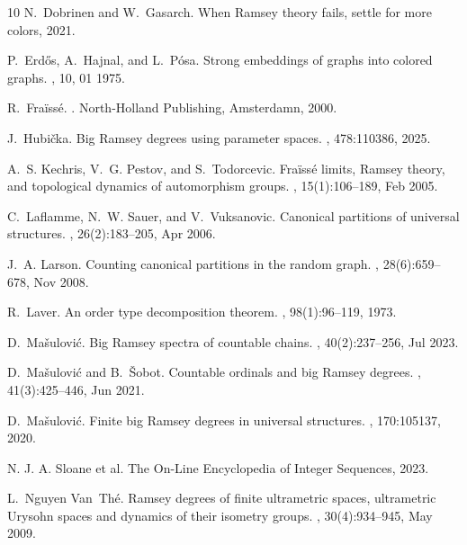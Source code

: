 \begin{thebibliography}{10}
N.~Dobrinen and W.~Gasarch.
\newblock When {R}amsey theory fails, settle for more colors, 2021.

P.~Erdős, A.~Hajnal, and L.~Pósa.
\newblock Strong embeddings of graphs into colored graphs.
, 10, 01 1975.

R.~{Fra\"{i}ss\'{e}}.
.
\newblock North-Holland Publishing, Amsterdamn, 2000.

J.~Hubička.
\newblock Big {R}amsey degrees using parameter spaces.
, 478:110386, 2025.

A.~S. Kechris, V.~G. Pestov, and S.~Todorcevic.
\newblock Fra{\"i}ss{\'e} limits, {R}amsey theory, and topological dynamics of
  automorphism groups.
, 15(1):106--189, Feb
  2005.

C.~Laflamme, N.~W. Sauer, and V.~Vuksanovic.
\newblock Canonical partitions of universal structures.
, 26(2):183--205, Apr 2006.

J.~A. Larson.
\newblock Counting canonical partitions in the random graph.
, 28(6):659--678, Nov 2008.

R.~Laver.
\newblock An order type decomposition theorem.
, 98(1):96--119, 1973.

D.~Ma{\v{s}}ulovi{\'{c}}.
\newblock Big {R}amsey spectra of countable chains.
, 40(2):237--256, Jul 2023.

D.~Ma{\v{s}}ulovi{\'{c}} and B.~{\v{S}}obot.
\newblock Countable ordinals and big {R}amsey degrees.
, 41(3):425--446, Jun 2021.

D.~Mašulović.
\newblock Finite big {R}amsey degrees in universal structures.
, 170:105137, 2020.

{N. J. A. Sloane et al.}
\newblock The {On-Line Encyclopedia of Integer Sequences}, 2023.

L.~Nguyen Van~Th\'e.
\newblock Ramsey degrees of finite ultrametric spaces, ultrametric {U}rysohn
  spaces and dynamics of their isometry groups.
, 30(4):934–945, May 2009.


\end{thebibliography}
